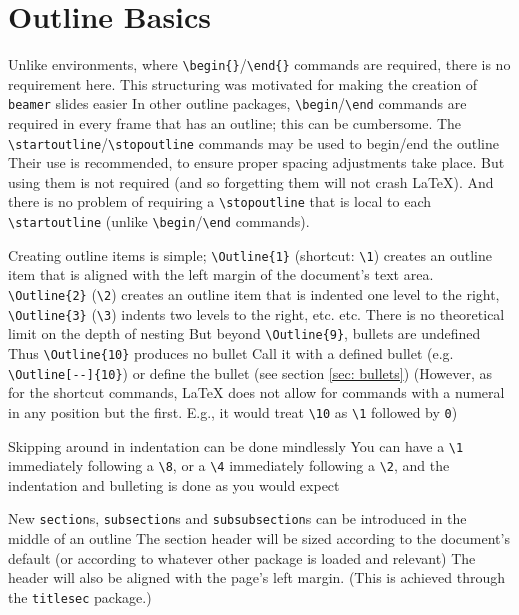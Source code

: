 \documentclass[11pt]{article}
\begin{document}
\section{Outline Basics}\label{sec: basics}
\1 Unlike environments, where \verb+\begin{}+/\verb+\end{}+ commands are required, there is no requirement here.
	\2 This structuring was motivated for making the creation of \texttt{beamer} slides easier
		\3 In other outline packages, \verb+\begin+/\verb+\end+ commands are required in every frame that has an outline; this can be cumbersome. 
	\2 The \verb+\startoutline+/\verb+\stopoutline+ commands may be used to begin/end the outline
		\3 Their use is recommended, to ensure proper spacing adjustments take place.
		\3 But using them is not required (and so forgetting them will not crash \LaTeX).
		\3 And there is no problem of requiring a \verb+\stopoutline+ that is local to each \verb+\startoutline+ (unlike \verb+\begin+/\verb+\end+ commands).

\1 Creating outline items is simple; \verb+\Outline{1}+ (shortcut: \verb+\1+) creates an outline item that is aligned with the left margin of the document's text area.
	\2 \verb+\Outline{2}+ (\verb+\2+) creates an outline item that is indented one level to the right, \verb+\Outline{3}+ (\verb+\3+) indents two levels to the right, etc. etc.
	\2 There is no theoretical limit on the depth of nesting
	\2 But beyond \verb+\Outline{9}+, bullets are undefined
		\3 Thus \verb+\Outline{10}+ produces no bullet
			\4 Call it with a defined bullet (e.g. \verb+\Outline[--]{10}+) or define the bullet (see section \ref{sec: bullets})
	\2 (However, as for the shortcut commands, \LaTeX{} does not allow for commands with a numeral in any position but the first. E.g., it would treat \verb+\10+ as \verb+\1+ followed by \verb+0+)

\1 Skipping around in indentation can be done mindlessly
	\2 You can have a \verb+\1+ immediately following a \verb+\8+, or a \verb+\4+ immediately following a \verb+\2+, and the indentation and bulleting is done as you would expect

\1 New \verb+section+s, \verb+subsection+s and \verb+subsubsection+s can be introduced in the middle of an outline
	\2 The section header will be sized according to the document's default (or according to whatever other package is loaded and relevant)
	\2 The header will also be aligned with the page's left margin.  (This is achieved through the \verb+titlesec+ package.)
\end{document}
